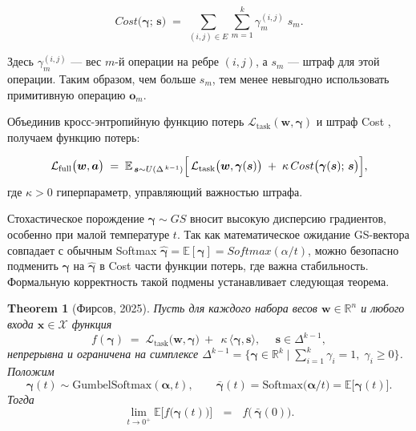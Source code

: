 \documentclass{article}
\newtheorem{theorem}{Theorem}
\begin{document}
$$
    Cost\bigl(\boldsymbol\gamma;\,\boldsymbol{s}\bigr)
    \;=\; 
    \sum_{(i,j)\in E} \sum_{m=1}^k 
    \gamma^{(i,j)}_m \;s_m.
$$

Здесь $\gamma^{(i,j)}_m$ --- вес $m$-й операции на ребре $(i,j)$, а $s_m$ — штраф для этой операции. Таким образом, чем больше $s_m$, тем менее невыгодно использовать примитивную операцию $\boldsymbol o_m$.

Объединив кросс-энтропийную функцию потерь $\mathcal L_{\mathrm{task}}(\boldsymbol w,\boldsymbol\gamma)$ и штраф Cost , получаем функцию потерь:

$$
    \mathcal L_{\mathrm{full}}\bigl(\boldsymbol w,\boldsymbol a\bigr)
    \;=\; 
    \mathbb E_{\,\boldsymbol{s} \sim U(\Delta^{\,k-1})}
    \Bigl[\,
      \mathcal L_{\mathrm{task}}\bigl(\boldsymbol w,\boldsymbol\gamma(\boldsymbol{s})\bigr)
      \;+\;\kappa\,Cost\bigl(\boldsymbol\gamma(\boldsymbol{s});\,\boldsymbol{s}\bigr)
    \Bigr],
$$
где $\kappa > 0$ гиперпараметр, управляющий важностью штрафа.

Стохастическое порождение $\boldsymbol\gamma\sim GS$ вносит высокую дисперсию градиентов, особенно при малой температуре $t$. Так как математическое ожидание GS-вектора совпадает с обычным Softmax $\boldsymbol{\hat\gamma} = \mathbb E[\boldsymbol\gamma] = Softmax(\alpha/t)$, можно безопасно подменить $\boldsymbol\gamma$ на $\boldsymbol{\hat\gamma}$ в Cost части функции потерь, где важна стабильность. Формальную корректность такой подмены устанавливает следующая теорема.



\begin{theorem} [Фирсов, 2025]
\label{th:gs_softmax}
Пусть для каждого набора весов $\boldsymbol w\in\mathbb R^n$
и любого входа $\boldsymbol x\in\mathcal X$ функция
$$
   f(\boldsymbol\gamma)
   \;=\;
   \mathcal L_{\mathrm{task}}\!\bigl(\boldsymbol w,\boldsymbol\gamma\bigr)
    \ + \ \  \kappa\,\langle\boldsymbol\gamma,\boldsymbol s\rangle,
    \ \ \ \ \ \ \boldsymbol s\in\Delta^{k-1},
$$
непрерывна и ограничена на симплексе
$\Delta^{k-1}
  =\bigl\{\boldsymbol\gamma\in\mathbb R^{k}\mid\sum_{i=1}^{k}\gamma_i=1,\;
          \gamma_i\ge 0\bigr\}
$.
Положим
$$
   \boldsymbol\gamma(t)\sim\mathrm{GumbelSoftmax}(\boldsymbol\alpha,t),
   \qquad
   \boldsymbol{\bar\gamma}(t)=\mathrm{Softmax}\!\bigl(\boldsymbol\alpha/t\bigr)
               =\mathbb E\bigl[\boldsymbol\gamma(t)\bigr].
$$
Тогда
$$
   \lim_{t\to 0^{+}}
       \mathbb E\bigl[f\bigl(\boldsymbol\gamma(t)\bigr)\bigr]
   \ \ \ = \ \ \ 
   f\!\bigl(\,\boldsymbol{\bar\gamma}(0)\bigr).
$$
\end{theorem}
\end{document}

